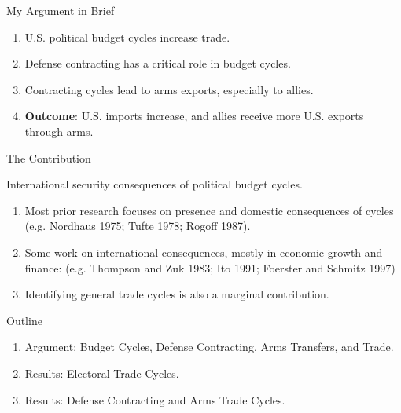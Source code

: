 \documentclass[12pt]{beamer}
\begin{document}

\begin{frame}{My Argument in Brief}

\begin{enumerate}
\item U.S. political budget cycles increase trade.  
\pause 
\item Defense contracting has a critical role in budget cycles.
\pause 
\item Contracting cycles lead to arms exports, especially to allies. 
\pause
\item \textbf{Outcome}: U.S. imports increase, and allies receive more U.S. exports through arms. 
\end{enumerate}

\end{frame}



\begin{frame}{The Contribution}


International security consequences of political budget cycles.  
\pause 
\begin{enumerate}
\item Most prior research focuses on presence and domestic consequences of cycles (e.g. Nordhaus 1975; Tufte 1978; Rogoff 1987). 
\pause 
\item Some work on international consequences, mostly in economic growth and finance: (e.g. Thompson and Zuk 1983; Ito 1991; Foerster and Schmitz 1997)
\pause 
\item Identifying general trade cycles is also a marginal contribution. 
\end{enumerate}

\end{frame}



\begin{frame}{Outline}

\pause
\begin{enumerate}
\item Argument: Budget Cycles, Defense Contracting, Arms Transfers, and Trade. 
\pause
\item Results: Electoral Trade Cycles. 
\pause
\item Results: Defense Contracting and Arms Trade Cycles.  
\end{enumerate}


\end{frame}
 
\end{document}
